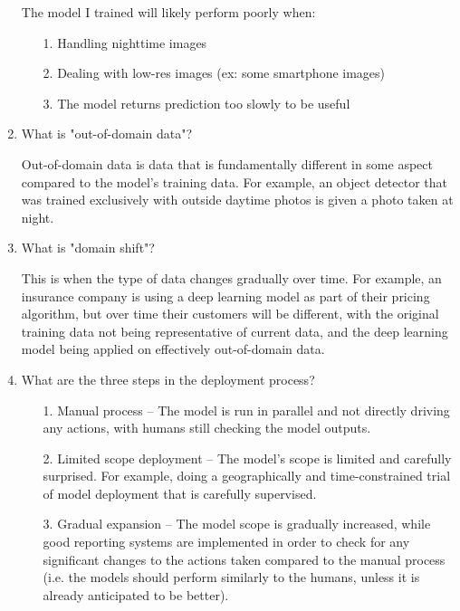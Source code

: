 \documentclass[12pt,a4paper]{article}
\begin{document}
\begin{enumerate}
\smallbreak

The model I trained will likely perform poorly when:
\begin{itemize}
\item[1.] Handling nighttime images
\item[2.] Dealing with low-res images (ex: some smartphone images)
\item[3.] The model returns prediction too slowly to be useful
\end{itemize}

\bigbreak

\item What is "out-of-domain data"? \\

\smallbreak

Out-of-domain data is data that is fundamentally different in some aspect compared to the model's training data. For example, an object detector that was trained exclusively with outside daytime photos is given a photo taken at night.

\bigbreak

\item What is "domain shift"? \\

\smallbreak

This is when the type of data changes gradually over time. For example, an insurance company is using a deep learning model as part of their pricing algorithm, but over time their customers will be different, with the original training data not being representative of current data, and the deep learning model being applied on effectively out-of-domain data.

\bigbreak

\item What are the three steps in the deployment process? \\

\smallbreak

\begin{itemize}
\item[1.] Manual process -- The model is run in parallel and not directly driving any actions, with humans still checking the model outputs.
\item[2.] Limited scope deployment -- The model's scope is limited and carefully surprised. For example, doing a geographically and time-constrained trial of model deployment that is carefully supervised.
\item[3.] Gradual expansion -- The model scope is gradually increased, while good reporting systems are implemented in order to check for any significant changes to the actions taken compared to the manual process (i.e. the models should perform similarly to the humans, unless it is already anticipated to be better).
\end{itemize}

\end{enumerate}
\end{document}
